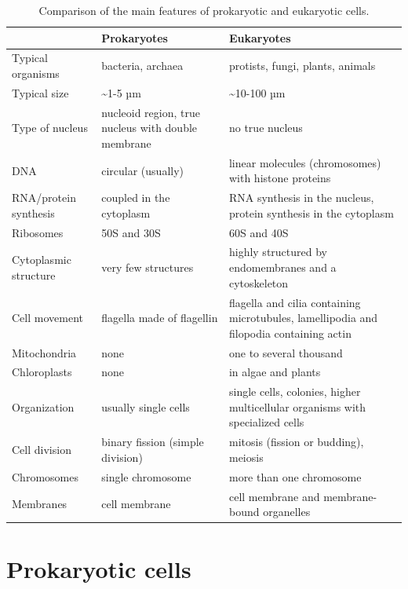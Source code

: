 \begin{longtable}[t]{>{\raggedright\arraybackslash}p{10em}>{\raggedright\arraybackslash}p{10em}>{\raggedright\arraybackslash}p{10em}}
\caption{\label{tab:eupro}Comparison of the main features of prokaryotic and eukaryotic cells.}\\
\toprule
 & Prokaryotes & Eukaryotes\\
\midrule
\rowcolor{gray!6}  Typical organisms & bacteria, archaea & protists, fungi, plants, animals\\
Typical size & \textasciitilde{}1-5 µm & \textasciitilde{}10-100 µm\\
\rowcolor{gray!6}  Type of nucleus & nucleoid region, true nucleus with double membrane & no true nucleus\\
DNA & circular (usually) & linear molecules (chromosomes) with histone proteins\\
\rowcolor{gray!6}  RNA/protein synthesis & coupled in the cytoplasm & RNA synthesis in the nucleus, protein synthesis in the cytoplasm\\
\addlinespace
Ribosomes & 50S and 30S & 60S and 40S\\
\rowcolor{gray!6}  Cytoplasmic structure & very few structures & highly structured by endomembranes and a cytoskeleton\\
Cell movement & flagella made of flagellin & flagella and cilia containing microtubules, lamellipodia and filopodia containing actin\\
\rowcolor{gray!6}  Mitochondria & none & one to several thousand\\
Chloroplasts & none & in algae and plants\\
\addlinespace
\rowcolor{gray!6}  Organization & usually single cells & single cells, colonies, higher multicellular organisms with specialized cells\\
Cell division & binary fission (simple division) & mitosis (fission or budding), meiosis\\
\rowcolor{gray!6}  Chromosomes & single chromosome & more than one chromosome\\
Membranes & cell membrane & cell membrane and membrane-bound organelles\\
\bottomrule
\end{longtable}

\hypertarget{prokaryotic-cells}{%
\section{Prokaryotic cells}\label{prokaryotic-cells}}

